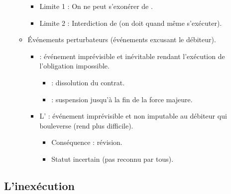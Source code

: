 \begin{itemize}
\begin{itemize}
		\begin{itemize}
			\item Limite 1 : On ne peut s'exonérer de .
			\item Limite 2 : Interdiction de  (on doit quand même s'exécuter).
		\end{itemize}
		\item Événements perturbateurs (événements excusant le débiteur).
		\begin{itemize}
			\item {} : événement imprévisible et inévitable rendant l'exécution de l'obligation impossible.
			\begin{itemize}
				\item {} : dissolution du contrat.
				\item {} : suspension jusqu'à la fin de la force majeure.
			\end{itemize}
			\item L' : événement imprévisible et non imputable au débiteur qui bouleverse  (rend plus difficile).
			\begin{itemize}
				\item Conséquence : révision.
				\item Statut incertain (pas reconnu par tous).
			\end{itemize}
		\end{itemize}
	\end{itemize}
\end{itemize}

\subsection{L'inexécution}

